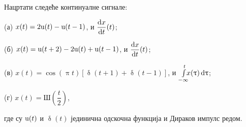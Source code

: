 \noindent
\PID
Нацртати следеће 
континуалне сигнале:\\
\begin{minipage}[c]{0.499\textwidth}
(а) $x(t) = 
2{\rm u}(t) - {\rm u}(t-1) 
$, и $\dfrac{{\rm d} x}{{\rm d} t}(t)$;

(б) $x(t) = {\rm u}(t+2) - 2{\rm u}(t) + {\rm u}(t-1)$,
и $\dfrac{{\rm d} x}{{\rm d} t}(t)$;
\end{minipage}
%
\begin{minipage}[c]{0.499\textwidth}
(в) 
$
x(t) = \cos(\uppi t)[\updelta(t + 1) 
+ \updelta(t-1)]
$, и $\int\limits_{-\infty}^t \hspace*{-0.5em}
x(\uptau)\, {\rm d}\uptau$;

(г) $x(t) = 
\text{Ш}\left(\dfrac t2\right)$,
\end{minipage}
\noindent
где су ${\rm u}(t)$ и $\updelta(t)$ јединична одскочна функција 
и Дираков импулс редом. \\

